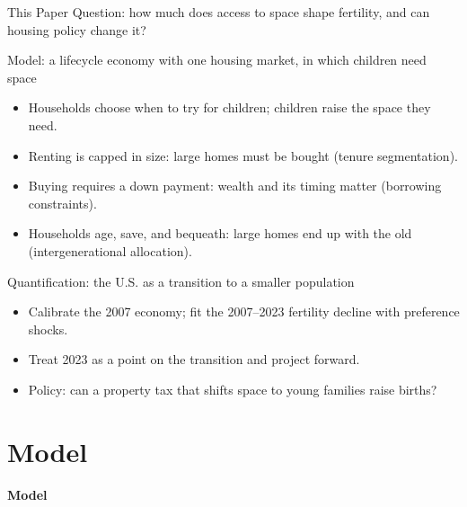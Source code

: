 \documentclass[11pt,aspectratio=169]{beamer}
\newcommand{\1}{\mathbf 1}
\begin{document}
\begin{frame}{This Paper}
\small
\alert{Question:} how much does access to space shape fertility, and can housing policy change it?

\medskip
\alert{Model:} a lifecycle economy with one housing market, in which children need space
\begin{itemize}\setlength\itemsep{2pt}
  \item Households choose when to try for children; children raise the space they need.
  \item Renting is capped in size: large homes must be bought (tenure segmentation).
  \item Buying requires a down payment: wealth and its timing matter (borrowing constraints).
  \item Households age, save, and bequeath: large homes end up with the old (intergenerational allocation).
\end{itemize}

\medskip
\alert{Quantification:} the U.S. as a transition to a smaller population
\begin{itemize}\setlength\itemsep{2pt}
  \item Calibrate the 2007 economy; fit the 2007--2023 fertility decline with preference shocks.
  \item Treat 2023 as a point on the transition and project forward.
  \item Policy: can a property tax that shifts space to young families raise births?
\end{itemize}
\end{frame}

\section{Model}

\begin{frame}{}
\centering
{\Large\textbf{Model}}
\end{frame}
\end{document}
